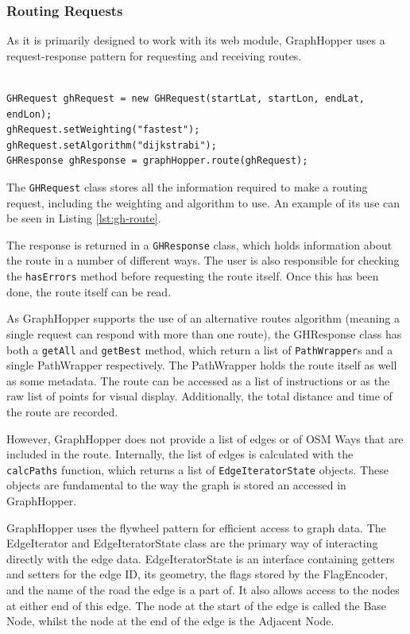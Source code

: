 \documentclass[ %
                    author={Alexander Hill},
                supervisor={Dr. Benjamin Sach},
                    degree={MEng},
                     title={MARMOSET},
                  subtitle={Multi-Agent Route Management using Online Simulation for Efficient Transportation},
                      type={research},
                      year={2016} ]{dissertation}
\begin{document}
\subsubsection{Routing Requests}

As it is primarily designed to work with its web module, GraphHopper uses a
request-response pattern for requesting and receiving routes.

\begin{lstlisting}[label=lst:gh-route,caption={GraphHopper request and response}]

GHRequest ghRequest = new GHRequest(startLat, startLon, endLat, endLon);
ghRequest.setWeighting("fastest");
ghRequest.setAlgorithm("dijkstrabi");
GHResponse ghResponse = graphHopper.route(ghRequest);

\end{lstlisting}

The \texttt{GHRequest} class stores all the information required to make a routing
request, including the weighting and algorithm to use. An example of its use
can be seen in Listing \ref{lst:gh-route}.

The response is returned in a \texttt{GHResponse} class, which holds information about
the route in a number of different ways. The user is also responsible for
checking the \texttt{hasErrors} method before requesting the route itself.
Once this has been done, the route itself can be read.

As GraphHopper supports the use of an alternative routes algorithm (meaning a
single request can respond with more than one route), the GHResponse class has
both a \texttt{getAll} and \texttt{getBest} method, which return a list of
\texttt{PathWrapper}s and a single PathWrapper respectively. The PathWrapper
holds the route itself as well as some metadata. The route can be accessed as
a list of instructions or as the raw list of points for visual display.
Additionally, the total distance and time of the route are recorded.

However, GraphHopper does not provide a list of edges or of OSM Ways that are
included in the route. Internally, the list of edges is calculated with the
\texttt{calcPaths} function, which returns a list of \texttt{EdgeIteratorState}
objects. These objects are fundamental to the way the graph is stored an
accessed in GraphHopper.

GraphHopper uses the flywheel pattern for efficient access to graph data. The
EdgeIterator and EdgeIteratorState class are the primary way of interacting
directly with the edge data. EdgeIteratorState is an interface containing
getters and setters for the edge ID, its geometry, the flags stored by the
FlagEncoder, and the name of the road the edge is a part of. It also allows
access to the nodes at either end of this edge. The node at the start of the
edge is called the Base Node, whilst the node at the end of the edge is the
Adjacent Node.
\end{document}
